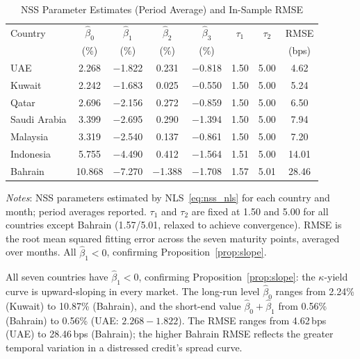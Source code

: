 \documentclass[12pt]{article}
\theoremstyle{plain}
\theoremstyle{definition}
\theoremstyle{remark}
\begin{document}
\begin{table}[htbp]
  \centering
  \caption{NSS Parameter Estimates (Period Average)
    and In-Sample RMSE}
  \label{tab:nss}
  \small
  \begin{tabular}{lccccccc}
    \toprule
    Country & $\hat{\beta}_0$ & $\hat{\beta}_1$ & $\hat{\beta}_2$ &
      $\hat{\beta}_3$ & $\tau_1$ & $\tau_2$ & RMSE \\
    & (\%) & (\%) & (\%) & (\%) & & & (bps) \\
    \midrule
    UAE          &  2.268 & $-$1.822 &  0.231 & $-$0.818 & 1.50 & 5.00 &  4.62 \\
    Kuwait       &  2.242 & $-$1.683 &  0.025 & $-$0.550 & 1.50 & 5.00 &  5.24 \\
    Qatar        &  2.696 & $-$2.156 &  0.272 & $-$0.859 & 1.50 & 5.00 &  6.50 \\
    Saudi Arabia &  3.399 & $-$2.695 &  0.290 & $-$1.394 & 1.50 & 5.00 &  7.94 \\
    Malaysia     &  3.319 & $-$2.540 &  0.137 & $-$0.861 & 1.50 & 5.00 &  7.20 \\
    Indonesia    &  5.755 & $-$4.490 &  0.412 & $-$1.564 & 1.51 & 5.00 & 14.01 \\
    Bahrain      & 10.868 & $-$7.270 & $-$1.388 & $-$1.708 & 1.57 & 5.01 & 28.46 \\
    \bottomrule
  \end{tabular}
  \begin{minipage}{\textwidth}
    \smallskip
    \footnotesize
    \textit{Notes}: NSS parameters estimated by NLS~\eqref{eq:nss_nls} for
    each country and month; period averages reported. $\tau_1$ and $\tau_2$ are
    fixed at 1.50 and 5.00 for all countries except Bahrain (1.57/5.01,
    relaxed to achieve convergence). RMSE is the root mean squared fitting error
    across the seven maturity points, averaged over months. All $\hat{\beta}_1 <
    0$, confirming Proposition~\ref{prop:slope}.
  \end{minipage}
\end{table}

All seven countries have $\hat{\beta}_1 < 0$, confirming
Proposition~\ref{prop:slope}: the $\kappa$-yield curve is upward-sloping
in every market. The long-run level $\hat{\beta}_0$ ranges from 2.24\%
(Kuwait) to 10.87\% (Bahrain), and the short-end value $\hat{\beta}_0 +
\hat{\beta}_1$ from 0.56\% (Bahrain) to 0.56\% (UAE: $2.268 - 1.822$).
The RMSE ranges from 4.62\,bps (UAE) to 28.46\,bps (Bahrain); the higher
Bahrain RMSE reflects the greater temporal variation in a distressed
credit's spread curve.
\end{document}
